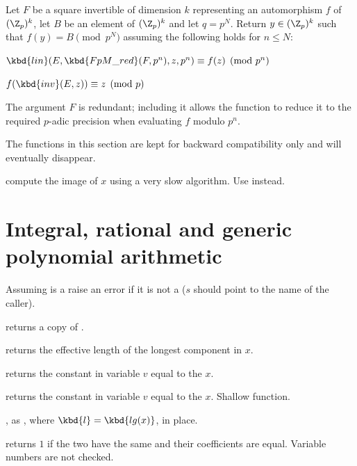 Let $F$ be a square invertible  of dimension $k$
representing an automorphism $f$ of $(\Z_p)^k$,
let $B$ be an element of $(\Z_p)^k$ and let $q = p^N$.  Return $y\in(\Z_p)^k$
such that $f(y)=B\pmod{p^N}$ assuming the following holds for $n\leq N$:

\item $\kbd{lin}(E, \kbd{FpM\_red}(F, p^n), z, p^n) \equiv f(z) \pmod{p^n}$

\item $f(\kbd{inv}(E, z)) \equiv z \pmod{p}$

The argument $F$ is redundant; including it allows the function
to reduce it to the required $p$-adic precision when evaluating $f$ modulo
$p^n$.


The functions in this section are kept for backward compatibility only
and will eventually disappear.

 compute the image of $x$ using a very slow
algorithm. Use  instead.

\section{Integral, rational and generic polynomial arithmetic}


 Assuming  is a 
raise an error if it is not a  ($s$ should point to the name of the
caller).

 returns a copy of .

 returns the effective length of the longest
component in $x$.

 returns the constant  in variable
$v$ equal to the  $x$.

 returns the constant  in
variable $v$ equal to the  $x$. Shallow function.

, as , where
$\kbd{l} = \kbd{lg(x)}$, in place.

 returns $1$ if the two  have
the same  and their coefficients are equal. Variable numbers are
not checked.

